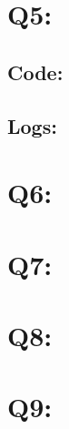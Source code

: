 \documentclass[11pt]{article}
\begin{document}
\section*{Q5:}

\subsection*{Code:}


\subsection*{Logs:}


\section*{Q6:}

\section*{Q7:}

\section*{Q8:}

\section*{Q9:}

\begin{appendices}\label{appendix}
  
\end{appendices}

\newpage

% 
% 
\end{document}
